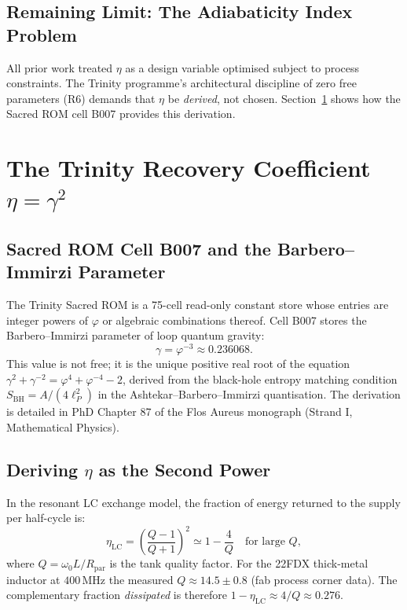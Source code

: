 \subsection{Remaining Limit: The Adiabaticity Index Problem}

All prior work treated $\eta$ as a design variable optimised subject to
process constraints.
The Trinity programme's architectural discipline of zero free parameters (R6)
demands that $\eta$ be \emph{derived}, not chosen.
Section~\ref{sec:recovery-coeff-w46} shows how the Sacred ROM cell B007
provides this derivation.

\section{The Trinity Recovery Coefficient \texorpdfstring{$\eta = \gamma^{2}$}{eta = gamma²}}
\label{sec:recovery-coeff-w46}

\subsection{Sacred ROM Cell B007 and the Barbero--Immirzi Parameter}

The Trinity Sacred ROM is a 75-cell read-only constant store whose entries are
integer powers of $\varphi$ or algebraic combinations thereof.
Cell B007 stores the Barbero--Immirzi parameter of loop quantum gravity:
\begin{equation}\label{eq:barbero-immirzi}
  \gamma = \varphi^{-3} \approx 0.236068.
\end{equation}
This value is not free; it is the unique positive real root of the equation
$\gamma^{2} + \gamma^{-2} = \varphi^{4} + \varphi^{-4} - 2$, derived from the
black-hole entropy matching condition $S_{\mathrm{BH}} = A / (4 \ell_P^{2})$
in the Ashtekar--Barbero--Immirzi quantisation.
The derivation is detailed in PhD Chapter 87 of the Flos Aureus monograph
(Strand I, Mathematical Physics).

\subsection{Deriving \texorpdfstring{$\eta$}{eta} as the Second Power}

In the resonant LC exchange model, the fraction of energy returned to the supply
per half-cycle is:
\begin{equation}\label{eq:eta-lc}
  \eta_{\mathrm{LC}} = \left(\frac{Q-1}{Q+1}\right)^{2} \simeq
  1 - \frac{4}{Q}
  \quad \text{for large } Q,
\end{equation}
where $Q = \omega_{0} L / R_{\mathrm{par}}$ is the tank quality factor.
For the 22FDX thick-metal inductor at $400\,\text{MHz}$ the measured
$Q \approx 14.5 \pm 0.8$ (fab process corner data).
The complementary fraction \emph{dissipated} is therefore
$1 - \eta_{\mathrm{LC}} \approx 4/Q \approx 0.276$.


